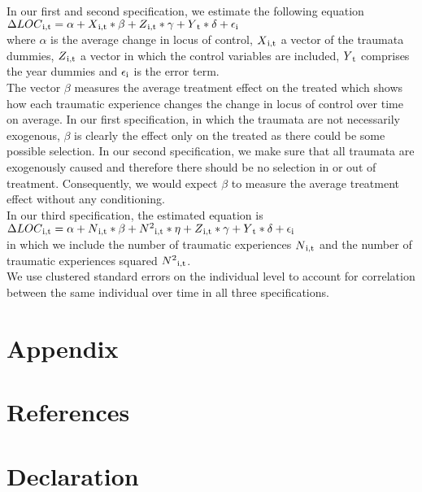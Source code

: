 \documentclass[12pt,a4paper,fleqn]{article}
\begin{document}
In our first and second specification, we estimate the following equation\\
$ \Delta LOC \textsubscript{i,t}= \alpha + X \textsubscript{i,t} * \beta + Z \textsubscript{i,t} * \gamma + Y\textsubscript{t} * \delta + \epsilon\textsubscript{i}  $ \\
where $\alpha$ is the average change in locus of control, $ X\textsubscript{i,t}$ a vector of the traumata dummies, $ Z\textsubscript{i,t}$ a vector in which the control variables are included, $ Y\textsubscript{t}$ comprises the year dummies and $\epsilon\textsubscript{i}$ is the error term. \\
The vector $\beta$ measures the average treatment effect on the treated which shows how each traumatic experience changes the change in locus of control over time on average. In our first specification, in which the traumata are not necessarily exogenous, $\beta $ is clearly the effect only on the treated as there could be some possible selection. In our second specification, we make sure that all traumata are exogenously caused and therefore there should be no selection in or out of treatment. Consequently, we would expect $\beta$ to measure the average treatment effect without any conditioning.  \\
In our third specification, the estimated equation is\\
$ \Delta LOC \textsubscript{i,t}= \alpha + N \textsubscript{i,t} * \beta + N \textsuperscript{2}\textsubscript{i,t} * \eta + Z \textsubscript{i,t} * \gamma + Y\textsubscript{t} * \delta + \epsilon\textsubscript{i}  $ \\
in which we include the number of traumatic experiences $N \textsubscript{i,t}$ and the number of traumatic experiences squared $N \textsuperscript{2}\textsubscript{i,t}$. \\
We use clustered standard errors on the individual level to account for correlation between the same individual over time in all three specifications. \\


\appendix
\setcounter{secnumdepth}{0}
\section{Appendix}




\pagebreak
\setcounter{secnumdepth}{0}
\section{References}




\pagebreak
\setcounter{secnumdepth}{0}
\section{Declaration}
\end{document}
